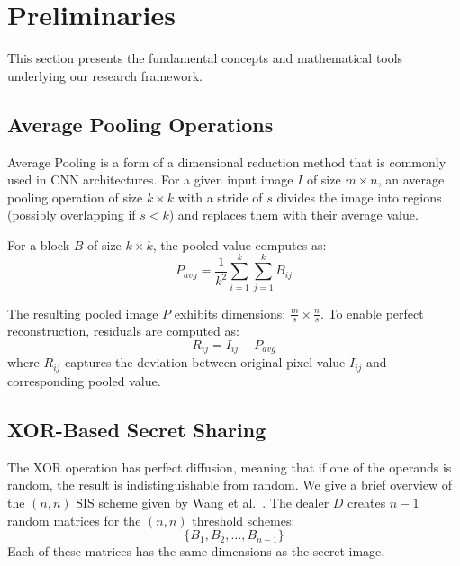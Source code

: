 \section{Preliminaries}
\label{sec:lad-prelim}


This section presents the fundamental concepts and mathematical tools underlying our research framework.

\subsection{Average Pooling Operations}

Average Pooling is a form of a dimensional reduction method that is commonly used in CNN architectures. For a given input image $I$ of size $m \times n$, an average pooling operation of size $k \times k$ with a stride of $s$ divides the image into regions (possibly overlapping if $s < k$) and replaces them with their average value.

For a block $B$ of size $k \times k$, the pooled value computes as:
\begin{equation}
P_{avg} = \frac{1}{k^2}\sum_{i=1}^{k}\sum_{j=1}^{k} B_{ij}
\end{equation}

The resulting pooled image $P$ exhibits dimensions: $\frac{m}{s} \times \frac{n}{s}$. To enable perfect reconstruction, residuals are computed as:
\begin{equation}
R_{ij} = I_{ij} - P_{avg}
\end{equation}
where $R_{ij}$ captures the deviation between original pixel value $I_{ij}$ and corresponding pooled value.

\subsection{XOR-Based Secret Sharing}

The XOR operation has perfect diffusion, meaning that if one of the operands is random, the result is indistinguishable from random. We give a brief overview of the $(n,n)$ SIS scheme given by Wang et al.~\cite{wang2007}. The dealer $D$ creates $n-1$ random matrices for the $(n,n)$ threshold schemes:
\begin{equation}
\{B_1, B_2, \dots, B_{n-1}\}
\end{equation}
Each of these matrices has the same dimensions as the secret image.

